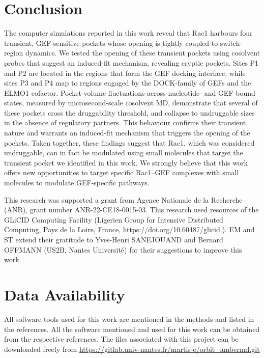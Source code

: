 \documentclass[12pt, a4paper]{achemso}
\begin{document}
\section{Conclusion}
The computer simulations reported in this work reveal that Rac1 harbours four transient, GEF-sensitive pockets whose opening is tightly coupled to switch-region dynamics. We tested the opening of these transient pockets using cosolvent probes that suggest an induced-fit mechanism, revealing cryptic pockets. Sites P1 and P2 are located in the regions that form the GEF docking interface, while sites P3 and P4 map to regions engaged by the DOCK-family of GEFs and the ELMO1 cofactor. Pocket-volume fluctuations across nucleotide- and GEF-bound states, measured by microsecond-scale cosolvent MD, demonstrate that several of these pockets cross the druggability threshold, and collapse to undruggable sizes in the absence of regulatory partners. This behaviour confirms their transient nature and warrants an induced-fit mechanism that triggers the opening of the pockets. Taken together, these findings suggest that Rac1, which was considered undruggable, can in fact be modulated using small molecules that target the transient pocket we identified in this work. We strongly believe that this work offers new opportunities to target specific Rac1–GEF complexes with small molecules to modulate GEF-specific pathways. 

\begin{acknowledgement}
This research was supported a grant from Agence Nationale de la Recherche (ANR), grant number ANR-22-CE18-0015-03. This research used resources of the GLiCID Computing Facility (Ligerien Group for Intensive Distributed Computing, Pays de la Loire, France, https://doi.org/10.60487/glicid.). EM and ST extend their gratitude to Yves-Henri SANEJOUAND and Bernard OFFMANN (US2B, Nantes Université) for their suggestions to improve this work. 
\end{acknowledgement}

\section{Data Availability}
All software tools used for this work are mentioned in the methods and listed in the references. All the software mentioned and used for this work can be obtained from the respective references. The files associated with this project can be downloaded freely from  \url{https://gitlab.univ-nantes.fr/martis-e/orbit_ambermd.git}
\end{document}
